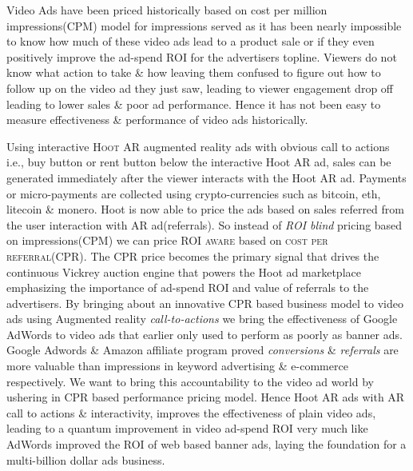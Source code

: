 Video Ads have been priced historically based on cost per million impressions(CPM) model for impressions served as it has been nearly impossible to know how much of these video ads lead to a product sale or if they even positively improve the ad-spend ROI for the advertisers topline. Viewers do not know what action to take \& how leaving them confused to figure out how to follow up on the video ad they just saw, leading to viewer engagement drop off leading to lower sales \& poor ad performance. Hence it has not been easy to measure effectiveness \& performance of video ads historically.

Using interactive \textsc{Hoot AR} augmented reality ads with obvious call to actions i.e., buy button or rent button below the interactive Hoot AR ad, sales can be generated immediately after the viewer interacts with the Hoot AR ad. Payments or micro-payments are collected using crypto-currencies such as bitcoin, eth, litecoin \& monero. Hoot is now able to price the ads based on sales referred from the user interaction with AR ad(referrals). So instead of \emph{ROI blind} pricing based on impressions(CPM) we can price \textsc{ROI aware} based on \textsc{cost per referral(CPR)}. The CPR price becomes the primary signal that drives the continuous Vickrey auction engine that powers the Hoot ad marketplace emphasizing the importance of ad-spend ROI and value of referrals to the advertisers. By bringing about an innovative CPR based business model to video ads using Augmented reality \emph{call-to-actions} we bring the effectiveness of Google AdWords to video ads that earlier only used to perform as poorly as banner ads. Google Adwords \& Amazon affiliate program proved \emph{conversions} \& \emph{referrals} are more valuable than impressions in keyword advertising \& e-commerce respectively. We want to bring this accountability to the video ad world by ushering in CPR based performance pricing model. Hence Hoot AR ads with AR call to actions \& interactivity, improves the effectiveness of plain video ads, leading to a quantum improvement in video ad-spend ROI very much like AdWords improved the ROI of web based banner ads, laying the foundation for a multi-billion dollar ads business. 
